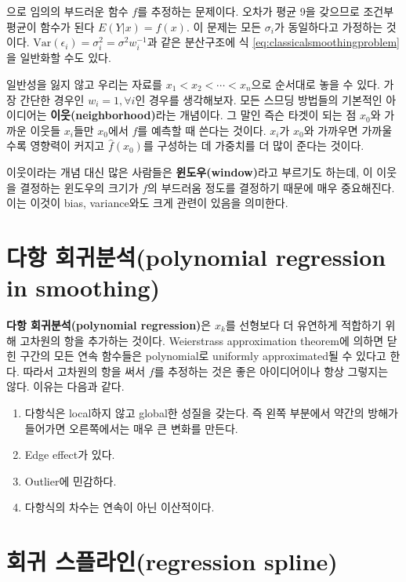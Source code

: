\documentclass[b5paper,]{scrbook}
\theoremstyle{plain}
\theoremstyle{definition}
\numberwithin{equation}{section}
\begin{document}
으로 임의의 부드러운 함수 \(f\)를 추정하는 문제이다. 오차가 평균 9을 갖으므로 조건부 평균이 함수가 된다 \(E(Y|x)=f(x)\). 이 문제는 모든 \(\sigma_{i}\)가 동일하다고 가정하는 것이다. \(\text{Var}(\epsilon_{i})=\sigma_{i}^{2}=\sigma^{2}w_{i}^{-1}\)과 같은 분산구조에 식 \eqref{eq:classicalsmoothingproblem}을 일반화할 수도 있다.

일반성을 잃지 않고 우리는 자료를 \(x_{1}< x_{2}<\cdots <x_{n}\)으로 순서대로 놓을 수 있다. 가장 간단한 경우인 \(w_{i}=1, \forall i\)인 경우를 생각해보자. 모든 스므딩 방법들의 기본적인 아이디어는 \textbf{이웃(neighborhood)}라는 개념이다. 그 말인 즉슨 타겟이 되는 점 \(x_{0}\)와 가까운 이웃들 \(x_{i}\)들만 \(x_{0}\)에서 \(f\)를 예측할 때 쓴다는 것이다. \(x_{i}\)가 \(x_{0}\)와 가까우면 가까울수록 영향력이 커지고 \(\hat{f}(x_{0})\)를 구성하는 데 가중치를 더 많이 준다는 것이다.

이웃이라는 개념 대신 많은 사람들은 \textbf{윈도우(window)}라고 부르기도 하는데, 이 이웃을 결정하는 윈도우의 크기가 \(f\)의 부드러움 정도를 결정하기 때문에 매우 중요해진다. 이는 이것이 bias, variance와도 크게 관련이 있음을 의미한다.

\hypertarget{-polynomial-regression-in-smoothing}{%
\section{다항 회귀분석(polynomial regression in smoothing)}\label{-polynomial-regression-in-smoothing}}

\textbf{다항 회귀분석(polynomial regression)}은 \(x_{k}\)를 선형보다 더 유연하게 적합하기 위해 고차원의 항을 추가하는 것이다. Weierstrass approximation theorem에 의하면 닫힌 구간의 모든 연속 함수들은 polynomial로 uniformly approximated될 수 있다고 한다. 따라서 고차원의 항을 써서 \(f\)를 추정하는 것은 좋은 아이디어이나 항상 그렇지는 않다. 이유는 다음과 같다.

\begin{enumerate}
\def\labelenumi{\arabic{enumi}.}
\item
  다항식은 local하지 않고 global한 성질을 갖는다. 즉 왼쪽 부분에서 약간의 방해가 들어가면 오른쪽에서는 매우 큰 변화를 만든다.
\item
  Edge effect가 있다.
\item
  Outlier에 민감하다.
\item
  다항식의 차수는 연속이 아닌 이산적이다.
\end{enumerate}

\hypertarget{-regression-spline}{%
\section{회귀 스플라인(regression spline)}\label{-regression-spline}}
\end{document}
